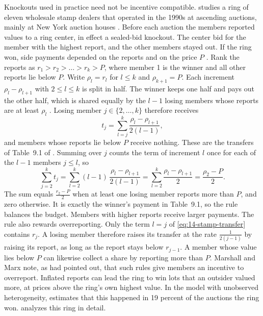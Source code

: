 Knockouts used in practice need not be incentive compatible. \citet{Asker2010} studies a ring of eleven
wholesale stamp dealers that operated in the 1990s at ascending auctions, mainly at New York auction
houses \citep[ch.~9, p.~192]{MarshallMarx2012}. Before each auction the members reported values to a
ring center, in effect a sealed-bid knockout. The center bid for the member with the highest report,
and the other members stayed out. If the ring won, side payments depended on the reports and on the
price $P$ \citep[ch.~9, pp.~192--194]{MarshallMarx2012}. Rank the reports as $r_1>r_2>\dots>r_k>P$,
where member 1 is the winner and all other reports lie below $P$. Write $\rho_l=r_l$ for $l\le k$ and
$\rho_{k+1}=P$. Each increment $\rho_l-\rho_{l+1}$ with $2\le l\le k$ is split in half. The winner
keeps one half and pays out the other half, which is shared equally by the $l-1$ losing members whose
reports are at least $\rho_l$ \citep[p.~193]{MarshallMarx2012}. Losing member $j\in\{2,\dots,k\}$
therefore receives
\begin{equation}\label{eq:14-stamp-transfer}
t_j=\sum_{l=j}^{k}\frac{\rho_l-\rho_{l+1}}{2(l-1)},
\end{equation}
and members whose reports lie below $P$ receive nothing. These are the transfers of Table~9.1 of
\citet[p.~193]{MarshallMarx2012}. Summing over $j$ counts the term of increment $l$ once for each of
the $l-1$ members $j\le l$, so
\[
\sum_{j=2}^{k}t_j=\sum_{l=2}^{k}(l-1)\,\frac{\rho_l-\rho_{l+1}}{2(l-1)}=\sum_{l=2}^{k}\frac{\rho_l-\rho_{l+1}}{2}=\frac{\rho_2-P}{2}.
\]
The sum equals $\frac{r_2-P}{2}$ when at least one losing member reports more than $P$, and zero
otherwise. It is exactly the winner's payment in Table~9.1, so the rule balances the budget. Members with higher reports
receive larger payments. The rule also rewards overreporting. Only the term $l=j$ of
\eqref{eq:14-stamp-transfer} contains $r_j$. A losing member therefore raises its transfer at the rate
$\frac{1}{2(j-1)}$ by raising its report, as long as the report stays below $r_{j-1}$. A member whose
value lies below $P$ can likewise collect a share by reporting more than $P$. Marshall and Marx note, as
\citet{GrahamMarshallRichard1990} had pointed out, that such rules give members an incentive to
overreport. Inflated reports can lead the ring to win lots that an outsider valued more, at prices
above the ring's own highest value. In the model with unobserved heterogeneity, \citet[Section~VII.C and
Table~10]{Asker2010} estimates that this happened in 19 percent of the auctions the ring won.
 analyzes this ring in detail.

